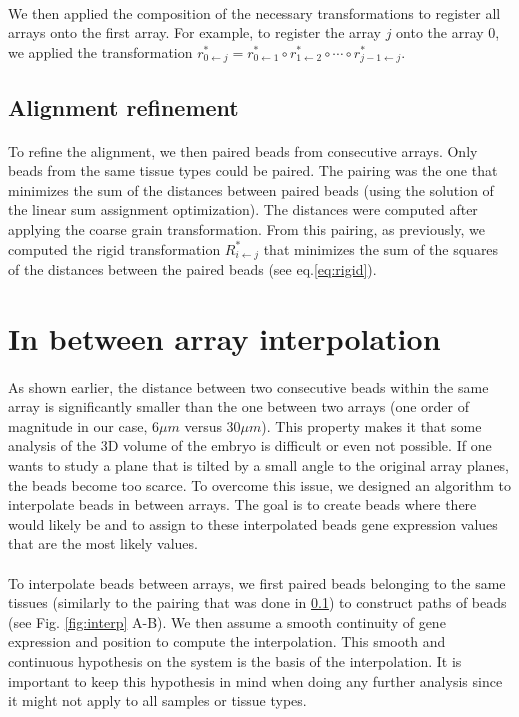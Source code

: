 \documentclass[10pt,a4paper]{article}
\begin{document}
\paragraph{}We then applied the composition of the necessary transformations to register all arrays onto the first array.
For example, to register the array \(j\) onto the array \(0\), we applied the transformation \(r_{0\leftarrow j}^*=r_{0\leftarrow 1}^*\circ r_{1\leftarrow 2}^*\circ \cdots \circ r_{j-1\leftarrow j}^*\).
\subsection{Alignment refinement}\label{subsec:ali-ref}
\paragraph{}To refine the alignment, we then paired beads from consecutive arrays.
Only beads from the same tissue types could be paired.
The pairing was the one that minimizes the sum of the distances between paired beads (using the solution of the linear sum assignment optimization).
The distances were computed after applying the coarse grain transformation.
From this pairing, as previously, we computed the rigid transformation \(R^*_{i\leftarrow j}\) that minimizes the sum of the squares of the distances between the paired beads (see eq.\eqref{eq:rigid}).
\section{In between array interpolation}
\paragraph{}As shown earlier, the distance between two consecutive beads within the same array is significantly smaller than the one between two arrays (one order of magnitude in our case, 6\(\mu m\) versus 30\(\mu m\)). This property makes it that some analysis of the 3D volume of the embryo is difficult or even not possible. If one wants to study a plane that is tilted by a small angle to the original array planes, the beads become too scarce. To overcome this issue, we designed an algorithm to interpolate beads in between arrays. The goal is to create beads where there would likely be and to assign to these interpolated beads gene expression values that are the most likely values.
\paragraph{}To interpolate beads between arrays, we first paired beads belonging to the same tissues (similarly to the pairing that was done in \ref{subsec:ali-ref}) to construct paths of beads (see Fig. \ref{fig:interp} A-B). We then assume a smooth continuity of gene expression and position to compute the interpolation. This smooth and continuous hypothesis on the system is the basis of the interpolation. It is important to keep this hypothesis in mind when doing any further analysis since it might not apply to all samples or tissue types.
\end{document}

